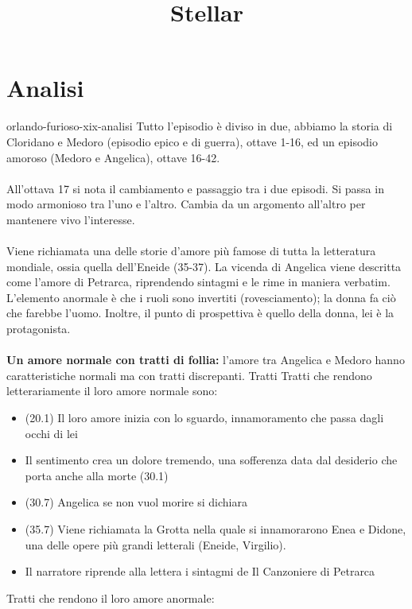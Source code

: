 \documentclass[preview]{standalone}
\begin{document}
\title{Stellar}
\genpage

\section{Analisi}

\begin{snippet}{orlando-furioso-xix-analisi}
    Tutto l'episodio è diviso in due,
    abbiamo la storia di Cloridano e Medoro (episodio epico e di guerra), ottave 1-16, 
    ed un episodio amoroso (Medoro e Angelica), ottave 16-42.
    \\\\
    All'ottava 17 si nota il cambiamento e passaggio tra i due episodi.
    Si passa in modo armonioso tra l'uno e l'altro.
    Cambia da un argomento all'altro per mantenere vivo l'interesse.
    \\\\
    Viene richiamata una delle storie d'amore più famose di tutta la letteratura mondiale,
    ossia quella dell'Eneide (35-37).
    La vicenda di Angelica viene descritta come l'amore di Petrarca, riprendendo sintagmi
    e le rime in maniera verbatim.
    L'elemento anormale è che i ruoli sono invertiti (rovesciamento); la donna
    fa ciò che farebbe l'uomo. Inoltre, il punto di prospettiva è quello della donna,
    lei è la protagonista.
    \\\\
    \textbf{Un amore normale con tratti di follia:}
    l'amore tra Angelica e Medoro hanno caratteristiche normali ma con tratti discrepanti.
    Tratti Tratti che rendono letterariamente il loro amore normale sono:
    \begin{itemize}
        \item (20.1) Il loro amore inizia con lo sguardo, innamoramento che passa dagli occhi di lei
        \item Il sentimento crea un dolore tremendo, una sofferenza data dal desiderio che porta anche
        alla morte (30.1)
        \item (30.7) Angelica se non vuol morire si dichiara
        \item (35.7) Viene richiamata la Grotta nella quale si innamorarono Enea e Didone, una delle opere più grandi letterali (Eneide, Virgilio).
        \item Il narratore riprende alla lettera i sintagmi de Il Canzoniere di Petrarca
    \end{itemize}
    Tratti che rendono il loro amore anormale:

\end{snippet}
\end{document}
